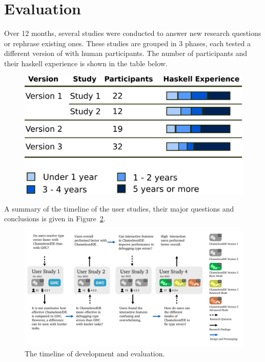 \section{Evaluation}

Over 12 months, several studies were conducted to answer new research questions or rephrase existing ones. These studies are grouped in 3 phases, each tested a different version of \chameleon{} with human participants. The number of participants and their haskell experience is shown in the table below. 

\begin{figure}[h]
    \centering
    \includegraphics[width=\linewidth]{images/participants-experience.png}
    \caption{}
    \label{fig:participant-experience}
\end{figure}

A summary of the timeline of the user studies, their major questions and conclusions is given in Figure~\ref{fig:timeline}.

\begin{figure}[h]
    \centering
    \includegraphics[width=\linewidth]{images/timeline.pdf}
    \caption{The timeline of \chameleon{}  development and 
    evaluation.}
    \label{fig:timeline}
\end{figure}

